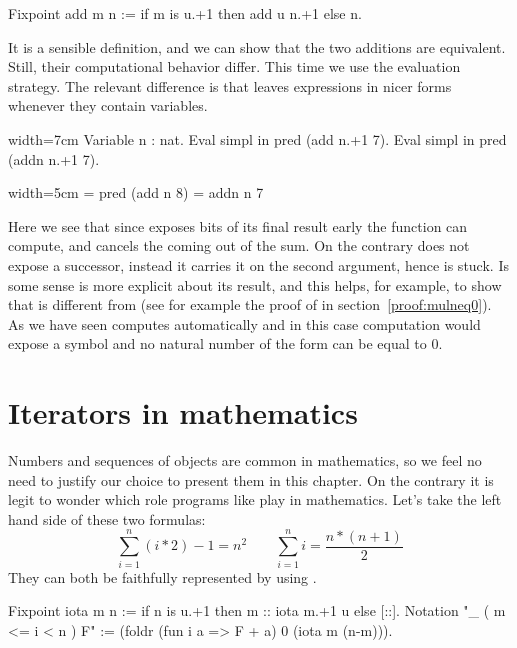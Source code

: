 \begin{coq}{}{}
Fixpoint add m n := if m is u.+1 then add u n.+1 else n.
\end{coq}

It is a sensible definition, and we can show that the two additions
are equivalent.  Still, their computational behavior differ.
This time we use the  evaluation strategy.  The relevant difference
is that  leaves expressions in nicer forms whenever they contain
variables.

\begin{coq}{}{width=7cm}
Variable n : nat.
Eval simpl in pred (add n.+1 7).
Eval simpl in pred (addn n.+1 7).
\end{coq}
\begin{coqout}{}{width=5cm}
= pred (add n 8)
= addn n 7
\end{coqout}

Here we see that since  exposes bits of its
final result early the  function can compute, and cancels
the  coming out of the sum.  On the contrary
 does not expose a successor, instead it carries it on the second
argument, hence  is stuck.  Is some sense  is more
explicit about its result, and this helps, for example, to show that
 is different from  (see for example
the proof of  in section~\ref{proof:mulneq0}).
As we have seen \Coq{} computes
automatically and in this case computation would expose a  symbol
and no natural number of the form  can be equal to 0.

\section{Iterators in mathematics}
\label{sec:bigopnat}

Numbers and sequences of objects are common in mathematics, so we feel
no need to justify our choice to present them in this chapter.
On the contrary it is legit to wonder which role programs like 
play in mathematics.
Let's take the left hand side of these two formulas:
$$
\sum_{i=1}^n (i * 2) - 1 = n ^ 2 \qquad
\sum_{i=1}^n i = \frac{n * (n + 1)}{2}
$$
They can both be faithfully represented by using .

\begin{coq}{}{}
Fixpoint iota m n := if n is u.+1 then m :: iota m.+1 u else [::].
Notation "\sum_ ( m <= i < n ) F" :=
  (foldr (fun i a => F + a) 0 (iota m (n-m))).
\end{coq}
\index[coq]{\C{\\sum}}

